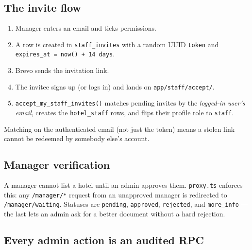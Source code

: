 \documentclass[11pt,a4paper]{article}
\newcommand{\file}[1]{\texttt{\small #1}}
\begin{document}
\subsection{The invite flow}

\begin{enumerate}[leftmargin=*,noitemsep]
  \item Manager enters an email and ticks permissions.
  \item A row is created in \texttt{staff\_invites} with a random UUID
        \texttt{token} and \texttt{expires\_at = now() + 14 days}.
  \item Brevo sends the invitation link.
  \item The invitee signs up (or logs in) and lands on \file{app/staff/accept/}.
  \item \texttt{accept\_my\_staff\_invites()} matches pending invites by the
        \emph{logged-in user's email}, creates the \texttt{hotel\_staff} rows, and
        flips their profile role to \texttt{staff}.
\end{enumerate}

Matching on the authenticated email (not just the token) means a stolen link
cannot be redeemed by somebody else's account.

\subsection{Manager verification}

A manager cannot list a hotel until an admin approves them. \file{proxy.ts}
enforces this: any \texttt{/manager/*} request from an unapproved manager is
redirected to \texttt{/manager/waiting}. Statuses are \texttt{pending},
\texttt{approved}, \texttt{rejected}, and \texttt{more\_info} --- the last lets an
admin ask for a better document without a hard rejection.

\subsection{Every admin action is an audited RPC}
\end{document}
